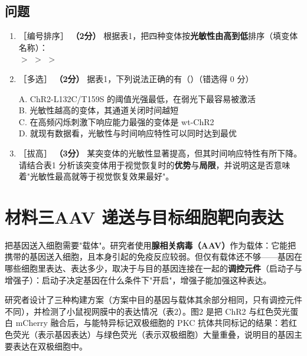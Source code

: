 \documentclass[UTF8,a4paper,11pt]{ctexart}
\newcommand{\pt}[1]{\textbf{（#1分）}}
\newcommand{\lv}[1]{{\small\color{deepgreen}［#1］}}
\newcommand{\tian}[1]{\underline{\hspace{#1}}}
\newcommand{\choice}[1]{\par\smallskip\noindent #1\par}
\begin{document}
\subsection*{问题}

\begin{enumerate}[leftmargin=2.2em,itemsep=5pt,start=5]
\item \lv{编号排序} \pt{2} 根据表1，把四种变体按\textbf{光敏性由高到低}排序（填变体名称）：\\
\tian{2.5cm} $>$ \tian{2.5cm} $>$ \tian{2.5cm} $>$ \tian{2.5cm}

\item \lv{多选} \pt{2} 据表1，下列说法正确的有（\quad）（错选得 0 分）\\
\choice{A. ChR2-L132C/T159S 的阈值光强最低，在弱光下最容易被激活\\
B. 光敏性越高的变体，其通道关闭时间越短\\
C. 在高频闪烁刺激下响应能力最强的变体是 wt-ChR2\\
D. 就现有数据看，光敏性与时间响应特性可以同时达到最优}

\item \lv{拔高} \pt{3} 某突变体的光敏性显著提高，但其时间响应特性有所下降。请结合表1 分析该突变体用于视觉恢复时的\textbf{优势}与\textbf{局限}，并说明这是否意味着"光敏性最高就等于视觉恢复效果最好"。
\end{enumerate}

\section{材料三\quad AAV 递送与目标细胞靶向表达}

把基因送入细胞需要"载体"。研究者使用\textbf{腺相关病毒（AAV）}作为载体：它能把携带的基因送入细胞，且本身引起的免疫反应较弱。但仅有载体还不够——基因在哪些细胞里表达、表达多少，取决于与目的基因连接在一起的\textbf{调控元件}（启动子与增强子）：启动子决定基因在什么条件下"开启"，增强子能加强这种表达。

研究者设计了三种构建方案（方案中目的基因与载体其余部分相同，只有调控元件不同），并检测了小鼠视网膜中的表达情况（表2）。图2 是把 ChR2 与红色荧光蛋白 mCherry 融合后，与能特异标记双极细胞的 PKC 抗体共同标记的结果：若红色荧光（表示基因表达）与绿色荧光（表示双极细胞）大量重叠，说明目的基因主要表达在双极细胞中。
\end{document}

